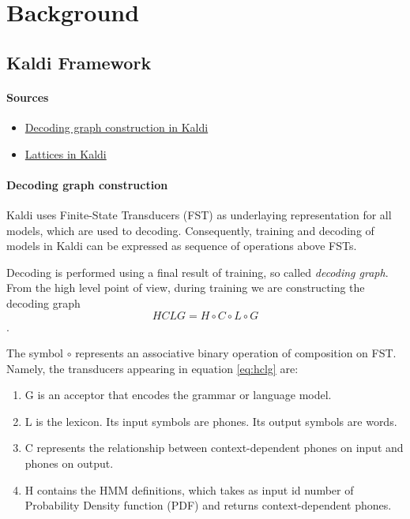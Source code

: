 \chapter{Background}
\label{cha:background}

\section{Kaldi Framework} %
\label{sec:kaldi}

\subsubsection*{Sources} %

\begin{itemize}
    \item \href{http://kaldi.sourceforge.net/graph.html} {Decoding graph construction in Kaldi}
    \item \href{http://kaldi.sourceforge.net/lattices.html} {Lattices in Kaldi}
\end{itemize}

\subsubsection*{Decoding graph construction} %
Kaldi uses Finite-State Transducers (FST) as underlaying representation for all models, which are used to decoding. Consequently, training and decoding of models in Kaldi can be expressed as sequence of operations above FSTs.

Decoding is performed using a final result of training, so called {\it decoding graph}. 
From the high level point of view,
during training we are constructing the decoding graph 
\begin{equation} \label{eq:hclg}
HCLG = H\circ C\circ L\circ G
\end{equation}.

The symbol $\circ$ represents an associative binary operation of composition on FST.
Namely, the transducers appearing in equation \ref{eq:hclg} are:
\begin{enumerate}
    \item G is an acceptor that encodes the grammar or language model.
    \item L is the lexicon. Its input symbols are phones. Its output symbols are words.
    \item C represents the relationship between context-dependent phones on input and phones on output.
    \item H contains the HMM definitions, which takes as input id number of Probability Density function (PDF) and returns context-dependent phones.
\end{enumerate}

